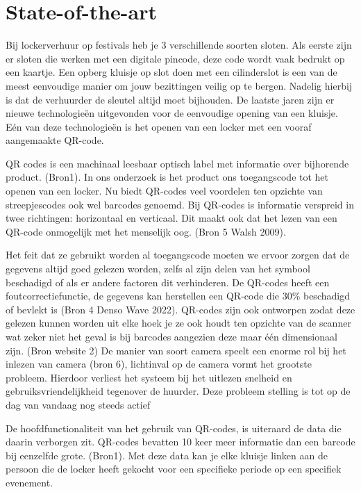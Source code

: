 \documentclass{hogent-article}
\begin{document}

\section{State-of-the-art}%
\label{sec:state-of-the-art}

Bij lockerverhuur op festivals heb je 3 verschillende soorten sloten. Als eerste zijn er sloten die werken met een digitale pincode, deze code wordt vaak bedrukt op een kaartje. Een opberg kluisje op slot doen met een cilinderslot is een van de meest eenvoudige manier om jouw bezittingen veilig op te bergen. Nadelig hierbij is dat de verhuurder de sleutel altijd moet bijhouden. De laatste jaren zijn er nieuwe technologieën uitgevonden voor de eenvoudige opening van een kluisje. Eén van deze technologieën is het openen van een locker met een vooraf aangemaakte QR-code.

QR codes is een machinaal leesbaar optisch label met informatie over bijhorende product. (Bron1). In ons onderzoek is het product ons toegangscode tot het openen van een locker. Nu biedt QR-codes veel voordelen ten opzichte van streepjescodes ook wel barcodes genoemd. Bij QR-codes is informatie verspreid in twee richtingen: horizontaal en verticaal. Dit maakt ook dat het lezen van een QR-code onmogelijk met het menselijk oog. (Bron 5 Walsh 2009). 

Het feit dat ze gebruikt worden al toegangscode moeten we ervoor zorgen dat de gegevens altijd goed gelezen worden, zelfs al zijn delen van het symbool beschadigd of als er andere factoren dit verhinderen. De QR-codes heeft een foutcorrectiefunctie, de gegevens kan herstellen een QR-code die 30\% beschadigd of bevlekt is (Bron 4 Denso Wave 2022). QR-codes zijn ook ontworpen zodat deze gelezen kunnen worden uit elke hoek je ze ook houdt ten opzichte van de scanner wat zeker niet het geval is bij barcodes aangezien deze maar één dimensionaal zijn. (Bron website 2) De manier van soort camera speelt een enorme rol bij het inlezen van camera (bron 6), lichtinval op de camera vormt het grootste probleem. Hierdoor verliest het systeem bij het uitlezen snelheid en gebruiksvriendelijkheid tegenover de huurder. Deze probleem stelling is tot op de dag van vandaag nog steeds actief

De hoofdfunctionaliteit van het gebruik van QR-codes, is uiteraard de data die daarin verborgen zit. QR-codes bevatten 10 keer meer informatie dan een barcode bij eenzelfde grote. (Bron1). Met deze data kan je elke kluisje linken aan de persoon die de locker heeft gekocht voor een specifieke periode op een specifiek evenement.
\end{document}
